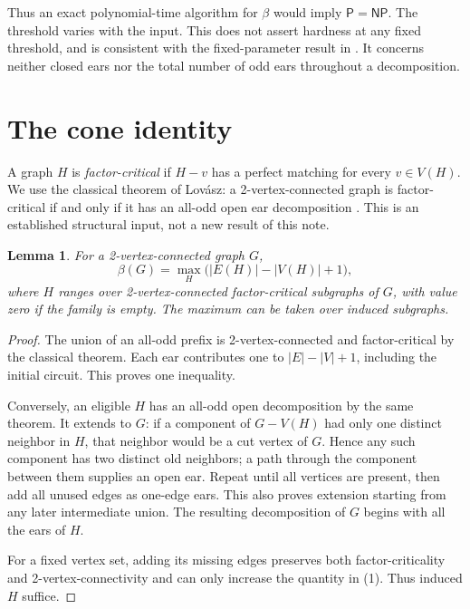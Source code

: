 \documentclass[11pt]{article}
\newtheorem{lemma}[theorem]{Lemma}
\newcommand{\NP}{\mathsf{NP}}
\newcommand{\PP}{\mathsf{P}}
\begin{document}
Thus an exact polynomial-time algorithm for \(\beta\) would imply
\(\PP=\NP\). The threshold varies with the input. This does not assert
hardness at any fixed threshold, and is consistent with the fixed-parameter
result in \cite{BS}. It concerns neither closed ears nor the total number
of odd ears throughout a decomposition.

\section{The cone identity}
A graph \(H\) is \emph{factor-critical} if \(H-v\) has a perfect matching
for every \(v\in V(H)\). We use the classical theorem of Lov\'asz:
a 2-vertex-connected graph is factor-critical if and only if it has an
all-odd open ear decomposition \cite{Lovasz,BS}. This is an established
structural input, not a new result of this note.

\begin{lemma}\label{lem:fc}
For a 2-vertex-connected graph \(G\),
\[
 \beta(G)=
 \max_H \bigl(|E(H)|-|V(H)|+1\bigr),
 \tag{1}\label{eq:fc}
\]
where \(H\) ranges over 2-vertex-connected factor-critical subgraphs of
\(G\), with value zero if the family is empty. The maximum can be taken
over induced subgraphs.
\end{lemma}
\begin{proof}
The union of an all-odd prefix is 2-vertex-connected and factor-critical
by the classical theorem. Each ear contributes one to
\(|E|-|V|+1\), including the initial circuit. This proves one inequality.

Conversely, an eligible \(H\) has an all-odd open decomposition by the
same theorem. It extends to \(G\): if a component of \(G-V(H)\) had only
one distinct neighbor in \(H\), that neighbor would be a cut vertex of
\(G\). Hence any such component has two distinct old neighbors; a path
through the component between them supplies an open ear. Repeat until
all vertices are present, then add all unused edges as one-edge ears.
This also proves extension starting from any later intermediate union.
The resulting decomposition of \(G\) begins with all the ears of \(H\).

For a fixed vertex set, adding its missing edges preserves both
factor-criticality and 2-vertex-connectivity and can only increase the
quantity in (1). Thus induced \(H\) suffice.
\end{proof}
\end{document}
